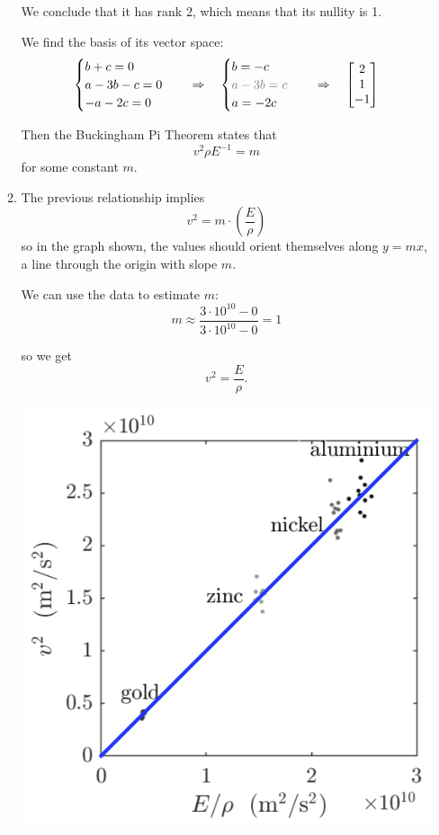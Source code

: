 \begin{enumerate}
\begin{enumerate}
	We conclude that it has rank 2, which means that its nullity is 1.
	
	We find the basis of its vector space:
	\[
	\begin{cases}
		b+c = 0 \\
		a-3b-c=0 \\
		-a-2c = 0
	\end{cases}
	\quad \Rightarrow \quad
		\begin{cases}
			b = -c \\
			\textcolor{gray}{a-3b= c} \\
			a = -2c
		\end{cases}
	\quad \Rightarrow \quad
		\begin{bmatrix}
			2\\ 1 \\ -1
		\end{bmatrix}
	\]
	
	Then the Buckingham Pi Theorem states that 
	\[
	v^2 \rho E^{-1} = m
	\]
	for some constant $m$.
	
	
	\item The previous relationship implies 
	\[ v^2 = m \cdot \left( \frac{E}{\rho} \right) \]
	so in the graph shown, the values should orient themselves along $y = mx$, a line through the origin with slope $m$.
	
	\begin{minipage}{.5\textwidth}
	We can use the data to estimate $m$:
	\[
	m \approx \frac{3\cdot 10^{10}-0}{3\cdot 10^{10}-0} = 1
	\]
	
	so we get 
	\[ v^2 = \frac{E}{\rho}. \]
	\end{minipage}
	\hfill 
	\begin{minipage}{200pt}
		\includegraphics[width=\textwidth]{WaveSpeed_YoungModulus-line.png}
	\end{minipage}
\end{enumerate}



\end{enumerate}
